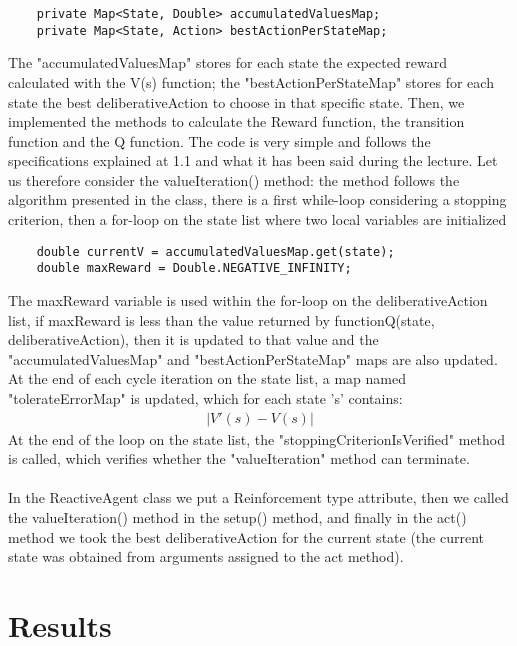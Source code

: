\documentclass[11pt]{article}
\begin{document}
\begin{lstlisting}
	private Map<State, Double> accumulatedValuesMap;
	private Map<State, Action> bestActionPerStateMap;
\end{lstlisting}
The "accumulatedValuesMap" stores for each state the expected reward calculated with the V(s) function; the "bestActionPerStateMap" stores for each state the best deliberativeAction to choose in that specific state.
Then, we implemented the methods to calculate the Reward function, the transition function and the Q function. The code is very simple and follows the specifications explained at 1.1 and what it has been said during the lecture.
Let us therefore consider the valueIteration() method: the method follows the algorithm presented in the class, there is a first while-loop considering a stopping criterion, then a for-loop on the state list where two local variables are initialized
\\
\begin{lstlisting}
	double currentV = accumulatedValuesMap.get(state);
	double maxReward = Double.NEGATIVE_INFINITY;
\end{lstlisting}
The maxReward variable is used within the for-loop on the deliberativeAction list, if maxReward is less than the value returned by functionQ(state, deliberativeAction), then it is updated to that value and the "accumulatedValuesMap" and "bestActionPerStateMap" maps are also updated. At the end of each cycle iteration on the state list, a map named  "tolerateErrorMap" is updated, which for each state 's' contains:
\begin{gather*}
| V'(s) - V(s)|
\end{gather*}
At the end of the loop on the state list, the "stoppingCriterionIsVerified" method is called, which verifies whether the "valueIteration" method can terminate.
\\
\\
In the ReactiveAgent class we put a Reinforcement type attribute, then we called the valueIteration() method in the setup() method, and finally in the act() method we took the best deliberativeAction for the current state (the current state was obtained from arguments assigned to the act method).


\section{Results}
\end{document}
